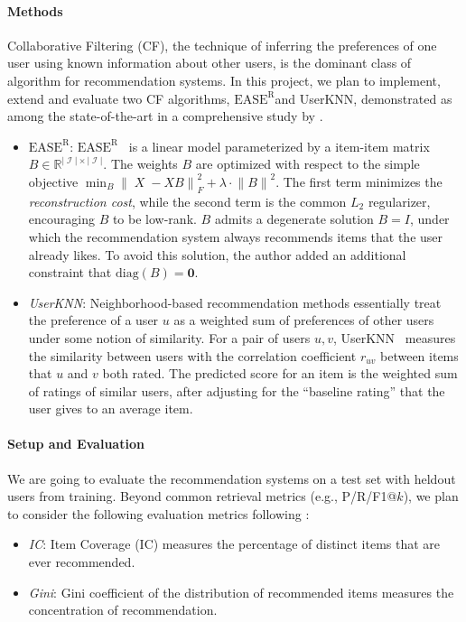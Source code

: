 \documentclass{article}
\DeclareMathOperator{\X}{\mathit{X}}
\DeclareMathOperator{\I}{\mathcal{I}}
\newcommand{\card}[1]{\ensuremath{\lvert {#1} \rvert}}
\newcommand{\easer}{$\text{EASE}^\text{R}$}
\newcommand{\userknn}{UserKNN\xspace}
\newcommand{\norm}[1]{\ensuremath{\lVert #1 \rVert}}
\begin{document}
\paragraph*{Methods}
Collaborative Filtering (CF), the technique of inferring the preferences of one
 user using known information about other users, is the dominant class of
 algorithm for recommendation systems.
In this project, we plan to implement, extend and evaluate two CF algorithms,
 \easer and \userknn, demonstrated as among the state-of-the-art in a
 comprehensive study by \citet{anelliTopNRecommendationAlgorithms2022}.

\begin{itemize}
	\item {\em \easer}:
	      \easer~\citep{steckEmbarrassinglyShallowAutoencoders2019}
	      is a linear model parameterized by a item-item matrix $B \in
		      \mathbb{R}^{\card{\I} \times \card{\I}}$.
	      The weights $B$ are optimized with respect to the simple objective $\min_B
		       \norm{\X - X B}_F^2 + \lambda \cdot \norm{B}^2$.
	      The first term minimizes the {\em reconstruction cost}, while the second term
	       is the common $L_2$ regularizer, encouraging $B$ to be low-rank.
	      $B$ admits a degenerate solution $B = I$, under which the
	      recommendation
	      system always recommends items that the user already likes.
	      To avoid this solution, the author added an additional constraint that
	       $\mathrm{diag}(B) = \mathbf{0}$.

	      \item{\em \userknn}: Neighborhood-based recommendation methods
	      essentially
	      treat the preference of a user $u$ as a weighted sum of
	      preferences of other
	      users under some notion of similarity.
	      For a pair of users $u, v$,
	       \userknn~\citep{resnickGroupLensOpenArchitecture1994} measures the similarity
	       between users with the correlation coefficient $r_{uv}$ between items that $u$
	       and $v$ both rated.
	      The predicted score for an item is the weighted sum of ratings of similar
	       users, after adjusting for the ``baseline rating'' that the user gives to an
	       average item.
\end{itemize}

\paragraph*{Setup and Evaluation}
We are going to evaluate the recommendation systems on a test set with heldout
 users from training.
Beyond common retrieval metrics (e.g., P/R/F1@$k$), we plan to consider the
 following evaluation metrics following
 \citet{anelliTopNRecommendationAlgorithms2022}:  \begin{itemize} \item {\em
             IC}: Item Coverage (IC) measures the percentage of distinct items that are ever
 recommended.
\item {\em Gini}: Gini coefficient of the distribution of recommended items
measures the concentration of recommendation.
\end{itemize}

\newpage


\end{document}

